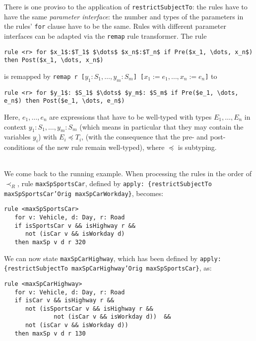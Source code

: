 There is one proviso to the application of \texttt{restrictSubjectTo}: the
rules have to have the same \emph{parameter interface}: the number and types
of the parameters in the rules' \texttt{for} clause have to be the same.
Rules with different parameter interfaces can be adapted via the
\texttt{remap} rule transformer. The rule 

\begin{lstlisting}[frame=none,mathescape=true]
rule <r> for $x_1$:$T_1$ $\dots$ $x_n$:$T_n$ if Pre($x_1, \dots, x_n$) then Post($x_1, \dots, x_n$)
\end{lstlisting}
is remapped by \texttt{remap r [$y_1: S_1, \dots, y_m: S_m$] [$x_1 := e_1, \dots, x_n := e_n$]}
to 
\begin{lstlisting}[frame=none,mathescape=true]
rule <r> for $y_1$: $S_1$ $\dots$ $y_m$: $S_m$ if Pre($e_1, \dots, e_n$) then Post($e_1, \dots, e_n$)
\end{lstlisting}
Here, $e_1, \dots, e_n$ are expressions that have to be well-typed with types $E_1, \dots, E_n$ in
context $y_1: S_1, \dots, y_m: S_m$ (which means in particular that they may
contain the variables $y_i$) with $E_i \preceq T_i$,  (with the consequence that
the pre- and post-conditions of the new rule remain well-typed), where $\preceq$ is subtyping. 


\begin{example}\mbox{}\\
We come back to the running example. When processing the rules in the order of
$\prec_R$, rule \texttt{maxSpSportsCar}, defined by
\texttt{apply: \{restrictSubjectTo maxSpSportsCar'Orig maxSpCarWorkday\}},
becomes:
\begin{lstlisting}
rule <maxSpSportsCar>
   for v: Vehicle, d: Day, r: Road
   if isSportsCar v && isHighway r &&
      not (isCar v && isWorkday d)
   then maxSp v d r 320
 \end{lstlisting}

 We can now state \texttt{maxSpCarHighway}, which has been defined by
 \texttt{apply: \{restrictSubjectTo maxSpCarHighway'Orig maxSpSportsCar\}}, as:

 \begin{lstlisting}
rule <maxSpCarHighway>
   for v: Vehicle, d: Day, r: Road
   if isCar v && isHighway r &&
      not (isSportsCar v && isHighway r &&
              not (isCar v && isWorkday d))  &&
      not (isCar v && isWorkday d))
   then maxSp v d r 130
\end{lstlisting}
\end{example}

